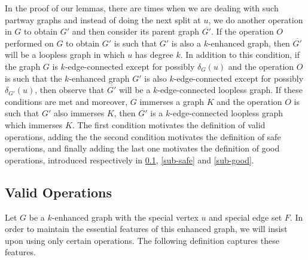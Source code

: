 \documentclass[letterpaper,11pt]{article}
\theoremstyle{definition}
\begin{document}
	
In the proof of our lemmas, there are times when we are dealing with such partway graphs and instead of doing the next split at $u$, we do another operation in $G$ to obtain $G'$ and then consider its parent graph  $\overline{G'}$. If the operation $O$ performed on $G$ to obtain $G'$ is such that $G'$ is also a $k$-enhanced graph, then $\overline{G'}$ will be a loopless graph in which $u$ has degree $k$.  In addition to this condition, if the graph $G$ is $k$-edge-connected except for possibly $\delta_{G} (u)$ and the operation $O$ is such that the $k$-enhanced graph $G'$ is also $k$-edge-connected except for possibly $\delta_{G'} (u)$, then observe that $\overline{G'}$ will be a $k$-edge-connected loopless graph. If these conditions are met and moreover, $G$ immerses a graph $K$ and the operation $O$ is such that $G'$ also immerses $K$, then $\overline{G'}$ is a $k$-edge-connected loopless graph which immerses $K$. The first condition motivates the definition of valid operations, adding the the second condition motivates the definition of safe operations, and finally adding the last one motivates the definition of good operations, introduced respectively in \cref{sub-valid}, \cref{sub-safe} and \cref{sub-good}.



\subsection{Valid Operations}
\label{sub-valid}

Let $G$ be a $k$-enhanced graph with the special vertex $u$ and special edge set $F$.  In order to maintain the essential features of this enhanced graph, we will insist upon using only certain operations.  The following definition captures these features.  
\end{document}

